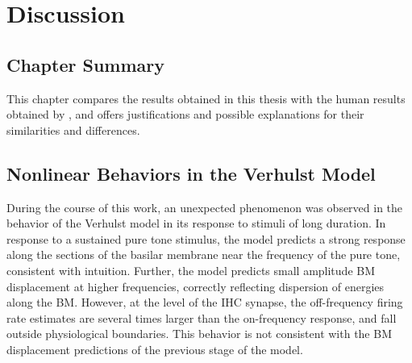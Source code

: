 \chapter{Discussion}
\label{chapter:Discussion}
\thispagestyle{myheadings}

\graphicspath{{6_Discussion/Figures/}}
\section{Chapter Summary} %
\label{sec:discussion_summary}
This chapter compares the results obtained in this thesis with the human results obtained by \citeauthor{Mehraei2016Auditory}, and offers justifications and possible explanations for their similarities and differences.
\iffalse
	\section{Comparison of Results to Prior Work} %
	\label{sec:comparison_of_results_to_prior_work}
	\subsection{Prior Models} %
	\label{sub:prior_models}

	\subsection{Prior Experimental Results} %
	\label{sub:prior_experimental_results}
\fi 

\section{Nonlinear Behaviors in the Verhulst Model} %
\label{sec:nonlinear_behaviors_in_the_verhulst_model}
During the course of this work, an unexpected phenomenon was observed in the behavior of the Verhulst model in its response to stimuli of long duration.  In response to a sustained pure tone stimulus, the model predicts a strong response along the sections of the basilar membrane near the frequency of the pure tone, consistent with intuition. Further, the model predicts small amplitude BM displacement at higher frequencies, correctly reflecting dispersion of energies along the BM.  However, at the level of the IHC synapse, the off-frequency firing rate estimates are several times larger than the on-frequency response, and fall outside physiological boundaries. This behavior is not consistent with the BM displacement predictions of the previous stage of the model.  

